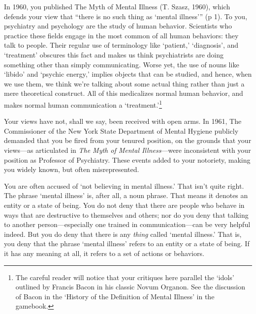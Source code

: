 \begin{refsection}
In 1960, you published The Myth of Mental Illness (T. Szasz, 1960), which defends your view that “there is no such thing as ‘mental illness’” (p 1). To you, psychiatry and psychology are the study of human behavior. Scientists who practice these fields engage in the most common of all human behaviors: they talk to people. Their regular use of terminology like ‘patient,’ ‘diagnosis’, and ‘treatment’ obscures this fact and makes us think psychiatrists are doing something other than simply communicating. Worse yet, the use of nouns like ‘libido’ and ‘psychic energy,’ implies objects that can be studied, and hence, when we use them, we think we’re talking about some actual thing rather than just a mere theoretical construct. All of this medicalizes normal human behavior, and makes normal human communication a ‘treatment.’\footnote{The careful reader will notice that your critiques here parallel the `idols' outlined by Francis Bacon in his classic Novum Organon. See the discussion of Bacon in the `History of the Definition of Mental Illness' in the gamebook.} 

Your views have not, shall we say, been received with open arms. In 1961, The Commissioner of the New York State Department of Mental Hygiene publicly demanded that you be fired from your tenured position, on the grounds that your views—as articulated in \emph{The Myth of Mental Illness}—were inconsistent with your position as Professor of Psychiatry. These events added to your notoriety, making you widely known, but often misrepresented.

You are often accused of ‘not believing in mental illness.’ That isn’t quite right. The phrase ‘mental illness’ is, after all, a noun phrase. That means it denotes an entity or a state of being. You do not deny that there are people who behave in ways that are destructive to themselves and others; nor do you deny that talking to another person—especially one trained in communication—can be very helpful indeed. But you do deny that there is any \emph{thing} called ‘mental illness.’ That is, you deny that the phrase ‘mental illness’ refers to an entity or a state of being. If it has any meaning at all, it refers to a set of actions or behaviors.


\end{refsection}
